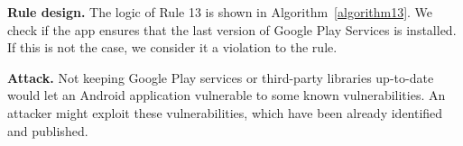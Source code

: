 \textbf{Rule design.} The logic of Rule 13 is shown in Algorithm~\ref{algorithm13}. We check if the app ensures that the last version of Google Play Services is installed. If this is not the case, we consider it a violation to the rule.

\setcounter{algocf}{12}
\begin{algorithm}[]
\SetAlgoLined
{}
\caption{}
\label{algorithm13}
\end{algorithm}

\textbf{Attack.} Not keeping Google Play services or third-party libraries up-to-date would let an Android application vulnerable to some known vulnerabilities. An attacker might exploit these vulnerabilities, which have been already identified and published.


